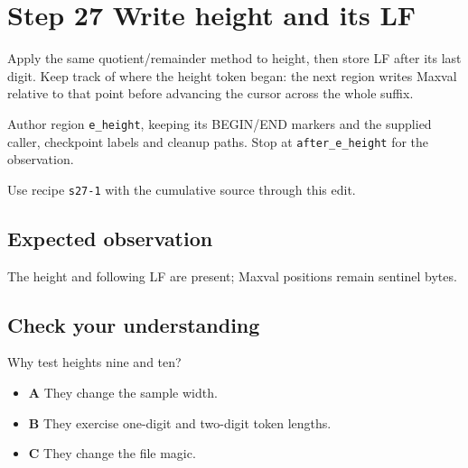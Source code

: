 \section{Step 27 Write height and its LF}\label{ppm-s27}

Apply the same quotient/remainder method to height, then store LF after its last digit. Keep track of where the height token began: the next region writes Maxval relative to that point before advancing the cursor across the whole suffix.

Author region \texttt{e\_height}, keeping its BEGIN/END markers and the supplied caller, checkpoint labels and cleanup paths. Stop at \texttt{after\_e\_height} for the observation.

Use recipe \texttt{s27-1} with the cumulative source through this edit.

\subsection{Expected observation}
The height and following LF are present; Maxval positions remain sentinel bytes.

\subsection{Check your understanding}
Why test heights nine and ten?

\begin{itemize}
  \item \textbf{A} They change the sample width.
  \item \textbf{B} They exercise one-digit and two-digit token lengths.
  \item \textbf{C} They change the file magic.
\end{itemize}
